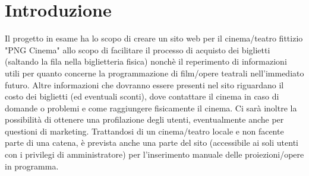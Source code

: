 \documentclass[a4paper, 12pt]{article}
\begin{document}
\makefrontpage

\section{Introduzione}
Il progetto in esame ha lo scopo di creare un sito web per il cinema/teatro fittizio "PNG Cinema" allo scopo di facilitare il processo di acquisto dei biglietti (saltando la fila nella biglietteria fisica) nonchè
il reperimento di informazioni utili per quanto concerne la programmazione di film/opere teatrali nell'immediato futuro.
Altre informazioni che dovranno essere presenti nel sito riguardano il costo dei biglietti (ed eventuali sconti), dove contattare il cinema in caso di domande o problemi e come raggiungere fisicamente il cinema.
Ci sarà inoltre la possibilità di ottenere una profilazione degli utenti, eventualmente anche per questioni di marketing.
Trattandosi di un cinema/teatro locale e non facente parte di una catena, è prevista anche una parte del sito (accessibile ai soli utenti con i privilegi di amministratore) per l'inserimento manuale delle proiezioni/opere in programma.
\end{document}

